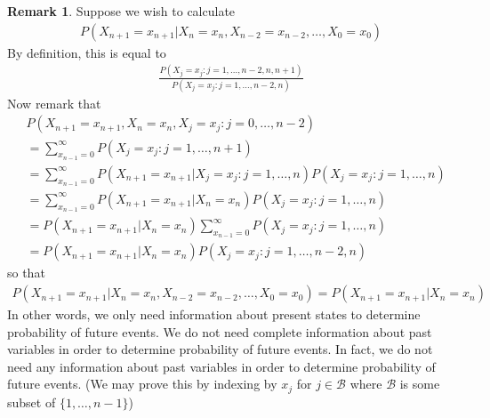 \documentclass[11pt]{amsart}
\theoremstyle{definition}
\newtheorem{remark}[theorem]{Remark}
\numberwithin{equation}{section}
\begin{document}
 \begin{remark}
     Suppose we wish to calculate
     \begin{align*}
         P(X_{n+1}=x_{n+1}|X_n=x_n,X_{n-2}=x_{n-2},\ldots,X_0=x_0)
     \end{align*}
     By definition, this is equal to 
     \begin{align*}
         \frac{P(X_j=x_j:j=1,\ldots,n-2,n,n+1)}{P(X_j=x_j:j=1,\ldots,n-2,n)}
     \end{align*}
     Now remark that
     \begin{align*}
         &P(X_{n+1}=x_{n+1},X_n=x_n,X_j=x_j:j=0,\ldots,n-2)\\
         &=\sum_{x_{n-1}=0}^\infty P(X_j=x_j:j=1,\ldots,n+1)\\
         &=\sum_{x_{n-1}=0}^\infty P(X_{n+1}=x_{n+1}|X_j=x_j:j=1,\ldots,n)P(X_j=x_j:j=1,\ldots,n)\\
         &=\sum_{x_{n-1}=0}^\infty P(X_{n+1}=x_{n+1}|X_n=x_n)P(X_j=x_j:j=1,\ldots,n)\\
         &=P(X_{n+1}=x_{n+1}|X_n=x_n)\sum_{x_{n-1}=0}^\infty P(X_j=x_j:j=1,\ldots,n)\\
         &=P(X_{n+1}=x_{n+1}|X_n=x_n)P(X_j=x_j:j=1,\ldots,n-2,n)
     \end{align*}
     so that
     \begin{align*}
         P(X_{n+1}=x_{n+1}|X_n=x_n,X_{n-2}=x_{n-2},\ldots,X_0=x_0)=P(X_{n+1}=x_{n+1}|X_n=x_n)
     \end{align*}
     In other words, we only need information about present states to determine probability of future events. We do not need complete information about past variables in order to determine probability of future events. In fact, we do not need any information about past variables in order to determine probability of future events. (We may prove this by indexing by $x_j$ for $j\in\mathcal B$ where $\mathcal B$ is some subset of $\{1,\ldots,n-1\}$)
 \end{remark}
\end{document}

